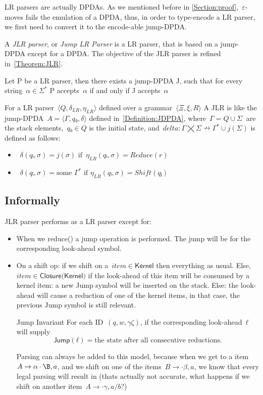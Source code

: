LR parsers are actually DPDAs\@. As we mentioned before in \cref{Section:proof},~$ε$-moves
  fails the emulation of a DPDA, thus, in order to type-encode a LR parser, we first need
  to convert it to the encode-able jump-DPDA\@.

A \emph{JLR parser}, or \emph{Jump LR Parser} is a LR parser, that
  is based on a jump-DPDA except for a DPDA\@.
The objective of the JLR parser is refined in~\cref{Theorem:JLR}.

\begin{Theorem}
  \label{Theorem:JLR}
  Let P be a LR parser, then there exists a jump-DPDA J,
  such that for every string~$α∈Σ^*$
  P accepts~$α$ if and only if J accepts~$α$
\end{Theorem}

For a LR parser~$⟨Q,δ_{LR}, η_{LR}⟩$ defined over a grammar~$⟨Ξ,ξ,R⟩$
A JLR is like the jump-DPDA~$A=⟨Γ,q₀,δ⟩$ defined in~\cref{Definition:JDPDA},
  where~$Γ= Q∪Σ~$ are the stack elements,~$q₀∈Q$ is the initial state, and~$delta:Γ⨉Σ↛Γ^*∪j(Σ)$ is defined as follows:
  \begin{itemize}
   \item~$δ(qᵢ,σ)= j(σ)$ if~$η_{LR}(qᵢ,σ)=Reduce(r)$
   \item~$δ(qᵢ,σ)= \text{some }Γ^*\text{ if }η_{LR}(qᵢ,σ)=Shift(qⱼ)$
  \end{itemize}


\subsection{Informally}

JLR parser performs as a LR parser except for:

\begin{itemize}
  \item When we \textsf{reduce()} a jump operation is performed.
    The jump will be for the corresponding look-ahead symbol.

  \item On a shift op:
  if we shift on a~$item∈\textsf{Kernel}$
    then everything as usual.
  Else,~$item∈\textsf{Closure(Kernel)}$
      if the look-ahead of this item will be consumed by a kernel item:
        a new Jump symbol will be inserted on the stack.
      Else:
        the look-ahead will cause a reduction of one of the kernel items,
        in that case, the previous Jump symbol is still relevant.
  \item[Jump Invariant] For each ID~$(q,w,γζ)$, if the corresponding look-ahead~$ℓ$ will 
    supply~\[
      \textsf{Jump}(ℓ)= \text{the state after all consecutive reductions}.
    \]
  \item[Parsing] can always be added to this model, because when we get to a item~$A\rightarrow\alpha\cdot\B,a$, and we shift on
    one of the items~$B\rightarrow\cdot\beta,a$, we know that every legal parsing will result in (thats actually not accurate, what happens
    if we shift on another item~$A\rightarrow\cdot\gamma,a/b$?)
\end{itemize}
